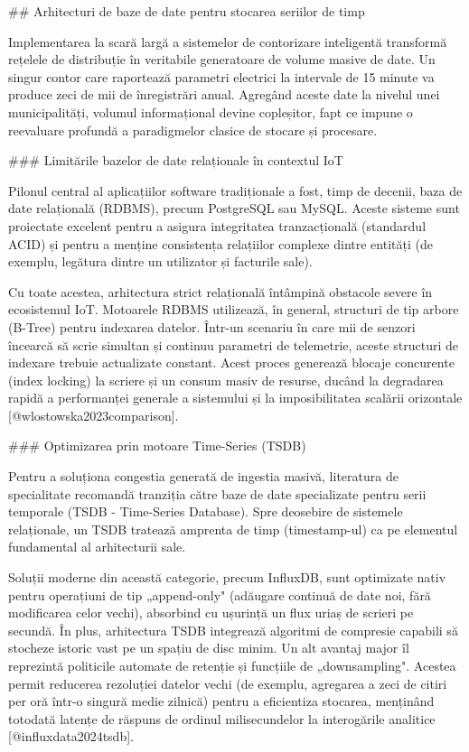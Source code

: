 ## Arhitecturi de baze de date pentru stocarea seriilor de timp

Implementarea la scară largă a sistemelor de contorizare inteligentă
transformă rețelele de distribuție în veritabile generatoare de volume
masive de date. Un singur contor care raportează parametri electrici la
intervale de 15 minute va produce zeci de mii de înregistrări anual.
Agregând aceste date la nivelul unei municipalități, volumul
informațional devine copleșitor, fapt ce impune o reevaluare profundă a
paradigmelor clasice de stocare și procesare.

### Limitările bazelor de date relaționale în contextul IoT

Pilonul central al aplicațiilor software tradiționale a fost, timp de
decenii, baza de date relațională (RDBMS), precum PostgreSQL sau MySQL.
Aceste sisteme sunt proiectate excelent pentru a asigura integritatea
tranzacțională (standardul ACID) și pentru a menține consistența
relațiilor complexe dintre entități (de exemplu, legătura dintre un
utilizator și facturile sale).

Cu toate acestea, arhitectura strict relațională întâmpină obstacole
severe în ecosistemul IoT. Motoarele RDBMS utilizează, în general,
structuri de tip arbore (B-Tree) pentru indexarea datelor. Într-un
scenariu în care mii de senzori încearcă să scrie simultan și continuu
parametri de telemetrie, aceste structuri de indexare trebuie
actualizate constant. Acest proces generează blocaje concurente (index
locking) la scriere și un consum masiv de resurse, ducând la degradarea
rapidă a performanței generale a sistemului și la imposibilitatea
scalării orizontale [@wlostowska2023comparison].

### Optimizarea prin motoare Time-Series (TSDB)

Pentru a soluționa congestia generată de ingestia masivă, literatura de
specialitate recomandă tranziția către baze de date specializate pentru
serii temporale (TSDB - Time-Series Database). Spre deosebire de
sistemele relaționale, un TSDB tratează amprenta de timp (timestamp-ul)
ca pe elementul fundamental al arhitecturii sale.

Soluții moderne din această categorie, precum InfluxDB, sunt optimizate
nativ pentru operațiuni de tip „append-only" (adăugare continuă de date
noi, fără modificarea celor vechi), absorbind cu ușurință un flux uriaș
de scrieri pe secundă. În plus, arhitectura TSDB integrează algoritmi de
compresie capabili să stocheze istoric vast pe un spațiu de disc minim.
Un alt avantaj major îl reprezintă politicile automate de retenție și
funcțiile de „downsampling". Acestea permit reducerea rezoluției datelor
vechi (de exemplu, agregarea a zeci de citiri per oră într-o singură
medie zilnică) pentru a eficientiza stocarea, menținând totodată latențe
de răspuns de ordinul milisecundelor la interogările analitice
[@influxdata2024tsdb].

